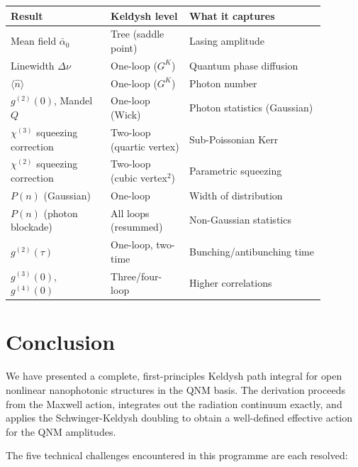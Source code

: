 \documentclass[12pt]{article}
\begin{document}
\begin{center}
\begin{tabular}{p{0.28\linewidth}p{0.22\linewidth}p{0.38\linewidth}}
\toprule
Result & Keldysh level & What it captures \\
\midrule
Mean field $\bar\alpha_0$ & Tree (saddle point) & Lasing amplitude \\
Linewidth $\Delta\nu$ & One-loop ($G^K$) & Quantum phase diffusion \\
$\langle\hat{n}\rangle$ & One-loop ($G^K$) & Photon number \\
$g^{(2)}(0)$, Mandel $Q$ & One-loop (Wick) & Photon statistics (Gaussian) \\
$\chi^{(3)}$ squeezing correction & Two-loop (quartic vertex) & Sub-Poissonian Kerr \\
$\chi^{(2)}$ squeezing correction & Two-loop (cubic vertex$^2$) & Parametric squeezing \\
$P(n)$ (Gaussian) & One-loop & Width of distribution \\
$P(n)$ (photon blockade) & All loops (resummed) & Non-Gaussian statistics \\
$g^{(2)}(\tau)$ & One-loop, two-time & Bunching/antibunching time \\
$g^{(3)}(0)$, $g^{(4)}(0)$ & Three/four-loop & Higher correlations \\
\bottomrule
\end{tabular}
\end{center}

\section{Conclusion}
\label{sec:conclusion}

We have presented a complete, first-principles Keldysh path integral for
open nonlinear nanophotonic structures in the QNM basis.  The derivation
proceeds from the Maxwell action, integrates out the radiation continuum
exactly, and applies the Schwinger-Keldysh doubling to obtain a
well-defined effective action for the QNM amplitudes.

The five technical challenges encountered in this programme are each
resolved:
\end{document}
